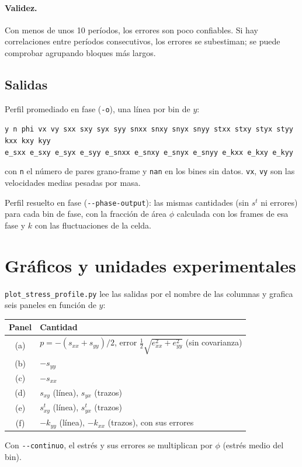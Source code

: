 \documentclass[11pt,a4paper]{article}
\newcommand{\code}[1]{\texttt{#1}}
\begin{document}
\paragraph{Validez.} Con menos de unos 10 períodos, los errores son poco
confiables. Si hay correlaciones entre períodos consecutivos, los errores
se subestiman; se puede comprobar agrupando bloques más largos.

\subsection{Salidas}

Perfil promediado en fase (\code{-o}), una línea por bin de $y$:
\begin{center}
  \small\code{y n phi vx vy sxx sxy syx syy snxx snxy snyx snyy stxx stxy
  styx styy kxx kxy kyy}\\
  \small\code{e\_sxx e\_sxy e\_syx e\_syy e\_snxx e\_snxy e\_snyx e\_snyy
  e\_kxx e\_kxy e\_kyy}
\end{center}
con \code{n} el número de pares grano-frame y \code{nan} en los bines sin
datos. \code{vx}, \code{vy} son las velocidades medias pesadas por masa.

Perfil resuelto en fase (\code{-{}-phase-output}): las mismas cantidades
(sin $s^t$ ni errores) para cada bin de fase, con la fracción de área
$\phi$ calculada con los frames de esa fase y $k$ con las fluctuaciones de
la celda.

\section{Gráficos y unidades experimentales}
\label{sec:unidades}

\code{plot\_stress\_profile.py} lee las salidas por el nombre de las
columnas y grafica seis paneles en función de $y$:
\begin{center}
\begin{tabular}{cl}
  \toprule
  Panel & Cantidad \\
  \midrule
  (a) & $p = -(s_{xx} + s_{yy})/2$, error $\frac{1}{2}\sqrt{e_{xx}^2 +
        e_{yy}^2}$ (sin covarianza) \\
  (b) & $-s_{yy}$ \\
  (c) & $-s_{xx}$ \\
  (d) & $s_{xy}$ (línea), $s_{yx}$ (trazos) \\
  (e) & $s^t_{xy}$ (línea), $s^t_{yx}$ (trazos) \\
  (f) & $-k_{yy}$ (línea), $-k_{xx}$ (trazos), con sus errores \\
  \bottomrule
\end{tabular}
\end{center}
Con \code{-{}-continuo}, el estrés y sus errores se multiplican por $\phi$
(estrés medio del bin).
\end{document}
